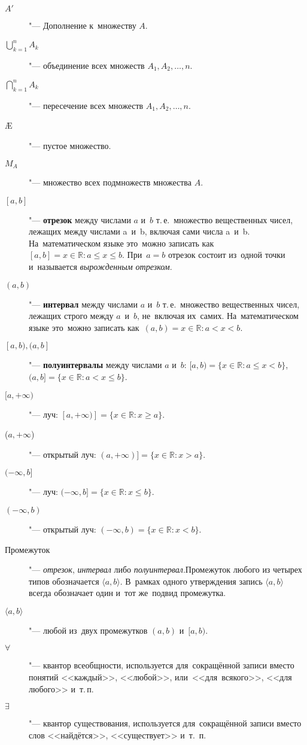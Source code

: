\documentclass[]{scrartcl}
\begin{document}
\begin{description}
	\item[$A'$] "--- Дополнение к~множеству $A$.
	\item[$\bigcup \limits_{k=1}^{n}A_k$] "--- объединение всех множеств $A_1, A_2,\ldots, n$.
	\item[$\bigcap \limits_{k=1}^{n}A_k$] "--- пересечение всех множеств $A_1, A_2,\ldots, n$.
	\item[\AE{}] "--- пустое множество.
	\item[$M_A$] "--- множество всех подмножеств множества $A$.
	\item[{$\left[ a,b \right]$}] "--- \textbf{отрезок} между числами $a$ и~$b$ т.\,е.~множество вещественных чисел, лежащих между числами a~и~b, включая сами числа a~и~b. На~математическом языке это~можно записать как~$[a, b] = {x \in \mathbb{R}: a \leq x \leq b }$. При~$a=b$ отрезок состоит из~одной точки и~называется \emph{вырожденным отрезком}.
	\item[$(a, b)$] "--- \textbf{интервал} между числами $a$ и~$b$ т.\,е.~множество вещественных чисел, лежащих строго между $a$~и~$b$, не~включая их~самих. На~математическом языке это~можно записать как~$(a, b) = {x \in \mathbb{R}: a < x < b }$.
	\item[{$\left[ a, b), (a, b\right] $}] "--- \textbf{полуинтервалы} между числами $a$ и~$b$: $[a,b) = \{x \in \mathbb{R}: a \leq x < b\}$, $(a,b] = \{x \in \mathbb{R}: a < x \leq b\}$.
	\item[$[a, +\infty)$] "--- луч: $[a, +\infty)] = \{x \in \mathbb{R}: x \geq a\}$.
	\item[($a, +\infty$)] "--- открытый луч: $(a, +\infty)] = \{x \in \mathbb{R}: x > a \}$.
	\item[{$(-\infty, b]$}] "--- луч: $(- \infty, b] = \{x \in \mathbb{R}: x \leq b\}$.
	\item[$(-\infty, b)$] "--- открытый луч: $(-\infty, b) = \{x \in \mathbb{R}: x < b\}$.
	\item[Промежуток] "--- \emph{отрезок}, \emph{интервал} либо \emph{полуинтервал}.Промежуток любого из четырех типов обозначается $\langle a, b \rangle$. В~рамках одного утверждения запись $\langle a, b \rangle$ всегда обозначает один и~тот же~подвид промежутка.
	\item[$\langle a, b \rangle$] "--- любой из~двух промежутков  $(a,b)$ и~$[a,b)$.
	\item[$\forall$] "--- квантор всеобщности, используется для~сокращённой записи вместо понятий <<каждый>>, <<любой>>, или~<<для~всякого>>, <<для любого>> и~т.\,п.
	\item[$\exists$] "--- квантор существования, используется для~сокращённой записи вместо слов <<найдётся>>, <<существует>> и~т.~п.

\end{description}
\end{document}
